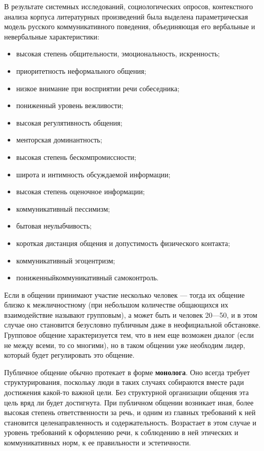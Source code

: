  В результате системных исследований, социологических опросов, контекстного анализа
 корпуса литературных произведений была выделена параметрическая модель русского коммуникативного поведения, объединяющая его вербальные и невербальные характеристики:
 \begin{itemize} 
    \item высокая степень общительности, эмоциональность, искренность;
    \item приоритетность неформального общения;
    \item низкое внимание при восприятии речи собеседника;
    \item пониженный уровень вежливости;
    \item высокая регулятивность общения;
    \item менторская доминантность;
    \item высокая степень бескомпромиссности;
    \item широта и интимность обсуждаемой информации;
    \item высокая степень оценочное информации;
    \item коммуникативный пессимизм;
    \item бытовая неулыбчивость;
    \item короткая дистанция общения и допустимость физического контакта;
    \item коммуникативный эгоцентризм;
    \item пониженныйкоммуникативный самоконтроль.
\end{itemize}

Если в общении принимают участие несколько человек — тогда их общение близко к межличностному (при небольшом количестве общающихся их взаимодействие называют групповым), а может быть и человек 20—50, и в этом случае оно становится безусловно публичным даже в неофициальной обстановке. Групповое общение характеризуется тем, что в нем еще возможен диалог (если не между всеми, то со многими), но в таком общении уже необходим лидер, который будет регулировать это общение.

 Публичное общение обычно протекает в форме \textbf{монолога}. Оно всегда требует структурирования, поскольку люди в таких случаях собираются вместе ради достижения какой-то важной цели. Без структурной организации общения эта цель вряд ли будет достигнута. При публичном общении возникает иная, более высокая степень ответственности за речь, и одним из главных требований к ней становится целенаправленность и содержательность. Возрастает в этом случае и уровень требований к оформлению речи, к соблюдению в ней этических и коммуникативных норм, к ее правильности и эстетичности.

